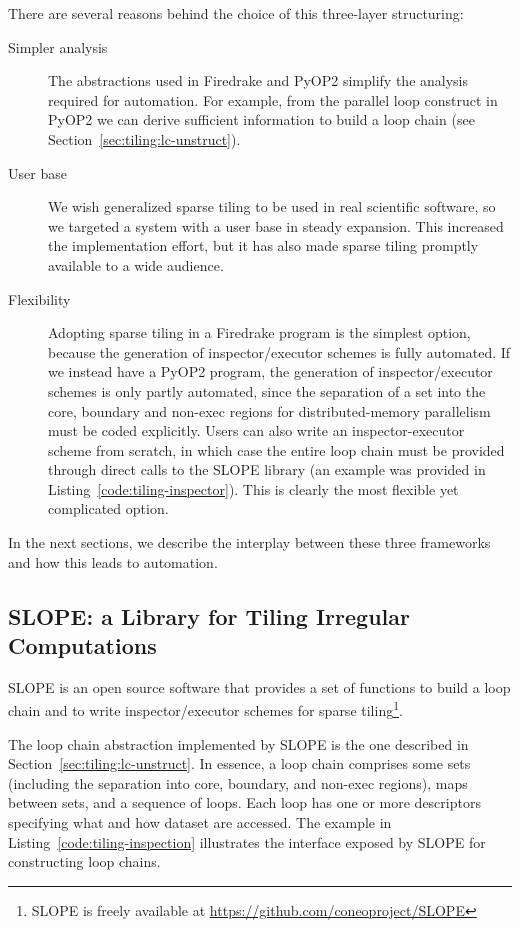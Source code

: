 There are several reasons behind the choice of this three-layer structuring:
\begin{description}
\item[Simpler analysis] The abstractions used in Firedrake and PyOP2 simplify the analysis required for automation. For example, from the parallel loop construct in PyOP2 we can derive sufficient information to build a loop chain (see Section~\ref{sec:tiling:lc-unstruct}).
\item[User base] We wish generalized sparse tiling to be used in real scientific software, so we targeted a system with a user base in steady expansion. This increased the implementation effort, but it has also made sparse tiling promptly available to a wide audience.
\item[Flexibility] Adopting sparse tiling in a Firedrake program is the simplest option, because the generation of inspector/executor schemes is fully automated. If we instead have a PyOP2 program, the generation of inspector/executor schemes is only partly automated, since the separation of a set into the core, boundary and non-exec regions for distributed-memory parallelism must be coded explicitly. Users can also write an inspector-executor scheme from scratch, in which case the entire loop chain must be provided through direct calls to the SLOPE library (an example was provided in Listing~\ref{code:tiling-inspector}). This is clearly the most flexible yet complicated option. 
\end{description}



In the next sections, we describe the interplay between these three frameworks and how this leads to automation.

\subsection{SLOPE: a Library for Tiling Irregular Computations}
SLOPE is an open source software that provides a set of functions to build a loop chain and to write inspector/executor schemes for sparse tiling\footnote{SLOPE is freely available at \url{https://github.com/coneoproject/SLOPE}}. 

The loop chain abstraction implemented by SLOPE is the one described in Section~\ref{sec:tiling:lc-unstruct}. In essence, a loop chain comprises some sets (including the separation into core, boundary, and non-exec regions), maps between sets, and a sequence of loops. Each loop has one or more descriptors specifying what and how dataset are accessed. The example in Listing~\ref{code:tiling-inspection} illustrates the interface exposed by SLOPE for constructing loop chains. 

